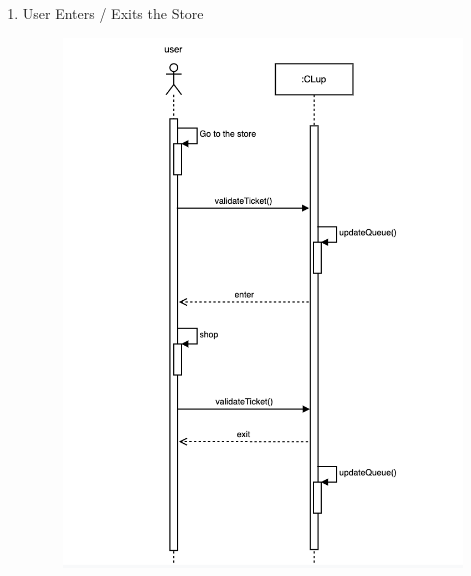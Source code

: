 \documentclass[]{article}
\begin{document}
\begin{enumerate}
						\item User Enters / Exits the Store
							\begin{figure}[H]
								\centering
								\includegraphics[scale=1.1]{enterexit.png}
								\caption{}
								\label{fig:enterexit_sequencediagram}
							\end{figure}
							\newpage
							

\end{enumerate}
\end{document}
